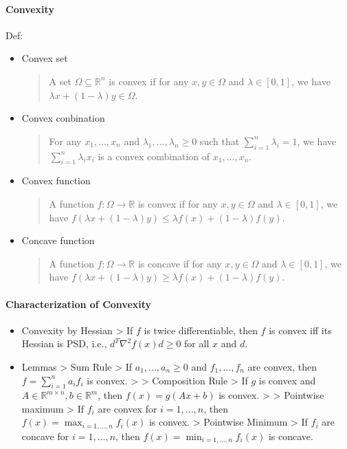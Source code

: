 \documentclass[11pt,a4paper]{article}
\begin{document}
\paragraph{Convexity}\label{convexity}

Def:
\begin{itemize}
\item Convex set
\begin{quote}
A set $\Omega \subseteq \mathbb{R}^n$ is convex if for any $x, y \in \Omega$ and $\lambda \in [0, 1]$, we have $\lambda x + (1 - \lambda) y \in \Omega$.
\end{quote}
\item Convex conbination
\begin{quote}
For any $x_1, ..., x_n$ and $\lambda_1, ..., \lambda_n \geq 0$ such that $\sum_{i=1}^n \lambda_i = 1$, we have $\sum_{i=1}^n \lambda_i x_i$ is a convex combination of $x_1, ..., x_n$.
\end{quote}
\item Convex function
\begin{quote}
A function $f: \Omega \to \mathbb{R}$ is convex if for any $x, y \in \Omega$ and $\lambda \in [0, 1]$, we have $f(\lambda x + (1 - \lambda) y) \leq \lambda f(x) + (1 - \lambda) f(y)$.
\end{quote}
\item Concave function
\begin{quote}
A function $f: \Omega \to \mathbb{R}$ is concave if for any $x, y \in \Omega$ and $\lambda \in [0, 1]$, we have $f(\lambda x + (1 - \lambda) y) \geq \lambda f(x) + (1 - \lambda) f(y)$.
\end{quote}
\end{itemize}

\paragraph{Characterization of Convexity}\label{characterization-of-convexity}

\begin{itemize}
\item
  Convexity by Hessian \textgreater{} If \(f\) is twice differentiable, then \(f\) is convex iff its Hessian is PSD, i.e., \(d^T \nabla^2 f(x) d \geq 0\) for all \(x\) and \(d\).
\item
  Lemmas \textgreater{} Sum Rule \textgreater{} If \(a_1, ..., a_n \geq 0\) and \(f_1, ..., f_n\) are convex, then \(f = \sum_{i=1}^n a_i f_i\) is convex. \textgreater{} \textgreater{} Composition Rule \textgreater{} If \(g\) is convex and \(A \in \mathbb{R}^{m \times n}, b \in \mathbb{R}^m\), then \(f(x) = g(Ax + b)\) is convex. \textgreater{} \textgreater{} Pointwise maximum \textgreater{} If \(f_i\) are convex for \(i = 1, ..., n\), then \(f(x) = \max_{i=1,...,n} f_i(x)\) is convex. \textgreater{} Pointwise Minimum \textgreater{} If \(f_i\) are concave for \(i = 1, ..., n\), then \(f(x) = \min_{i=1,...,n} f_i(x)\) is concave.
\end{itemize}
\end{document}

